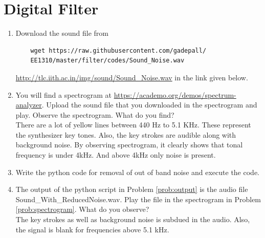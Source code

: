 \documentclass[journal,12pt,twocolumn]{IEEEtran}
\renewcommand\thesection{\arabic{section}}
\begin{document}
\section{Digital Filter}
\begin{enumerate}[label=\thesection.\arabic*
,ref=\thesection.\theenumi]
\item
\label{prob:input}
Download the sound file from  
\begin{lstlisting}
	wget https://raw.githubusercontent.com/gadepall/ 
	EE1310/master/filter/codes/Sound_Noise.wav
\end{lstlisting}
\href{http://tlc.iith.ac.in/img/sound/Sound_Noise.wav}{\url{http://tlc.iith.ac.in/img/sound/Sound_Noise.wav}}  
in the link given below.
\linebreak
\item
\label{prob:spectrogram}
You will find a spectrogram at \href{https://academo.org/demos/spectrum-analyzer}{\url{https://academo.org/demos/spectrum-analyzer}}. 
%
Upload the sound file that you downloaded in the spectrogram  and play.  Observe the spectrogram. What do you find?
\\
%
\solution There are a lot of yellow lines between 440 Hz to 5.1 KHz.  These represent the synthesizer key tones. Also, the key strokes
are audible along with background noise.
By observing spectrogram, it clearly shows that tonal frequency is under 4kHz. And above 4kHz only noise is present.
\item
\label{prob:output}
Write the python code for removal of out of band noise and execute the code.
\\
\solution


%
\item
The output of the python script in Problem \ref{prob:output} is the audio file Sound\_With\_ReducedNoise.wav. Play the file in the spectrogram in Problem \ref{prob:spectrogram}. What do you observe?
\\
\solution The key strokes as well as background noise is subdued in the audio.  Also,  the signal is blank for frequencies above 5.1 kHz.

\end{enumerate}
\end{document}
